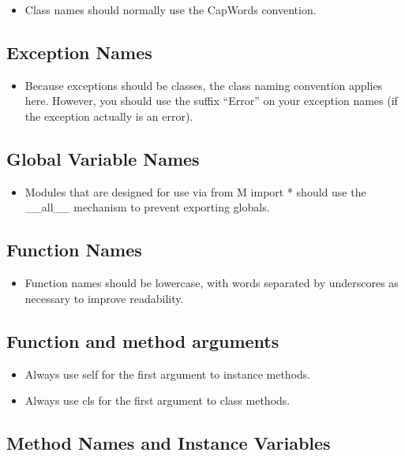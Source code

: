 \documentclass[11pt]{article}
\begin{document}
\begin{itemize}
\item Class names should normally use the CapWords convention.
\end{itemize}
\subsection{Exception Names}
\label{sec-4-5}

\begin{itemize}
\item Because exceptions should be classes, the class naming convention applies here. However, you should use the suffix ``Error'' on your exception names (if the exception actually is an error).
\end{itemize}
\subsection{Global Variable Names}
\label{sec-4-6}

\begin{itemize}
\item Modules that are designed for use via from M import * should use the \_\_all\_\_ mechanism to prevent exporting globals.
\end{itemize}
\subsection{Function Names}
\label{sec-4-7}

\begin{itemize}
\item Function names should be lowercase, with words separated by underscores as necessary to improve readability.
\end{itemize}
\subsection{Function and method arguments}
\label{sec-4-8}

\begin{itemize}
\item Always use self for the first argument to instance methods.
\item Always use cls for the first argument to class methods.
\end{itemize}
\subsection{Method Names and Instance Variables}
\label{sec-4-9}
\end{document}
